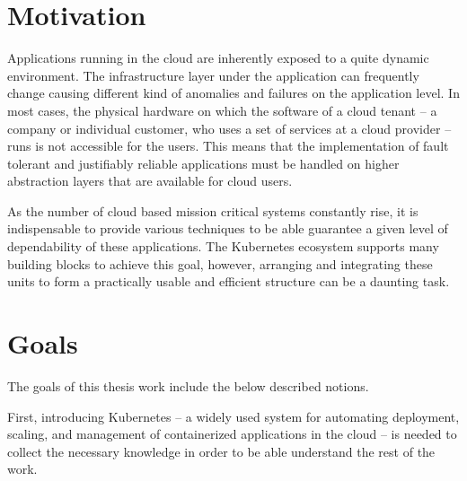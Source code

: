 \section{Motivation}

Applications running in the cloud are inherently exposed to a quite dynamic environment. The infrastructure layer under the application can frequently change causing different kind of anomalies and failures on the application level. In most cases, the physical hardware on which the software of a cloud tenant -- a company or individual customer, who uses a set of services at a cloud provider -- runs is not accessible for the users. This means that the implementation of fault tolerant and justifiably reliable applications must be handled on higher abstraction layers that are available for cloud users.

As the number of cloud based mission critical systems constantly rise, it is indispensable to provide various techniques to be able guarantee a given level of dependability of these applications. The Kubernetes ecosystem supports many building blocks to achieve this goal, however, arranging and integrating these units to form a practically usable and efficient structure can be a daunting task.


\section{Goals}

The goals of this thesis work include the below described notions.

First, introducing Kubernetes -- a widely used system for automating deployment, scaling, and management of containerized applications in the cloud -- is needed to collect the necessary knowledge in order to be able understand the rest of the work.

